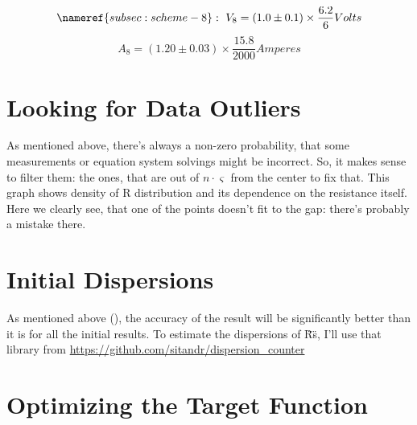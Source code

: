\documentclass[11pt]{memoir}
\newcommand{\initialCurrentDispersion}{0.03}
\newcommand{\initialVoltageDispersion}{0.1}
\newcommand{\voltageConvertingFrac}{\frac{6.2}{6}}
\newcommand{\currentConvertingFrac}{\frac{15.8}{2000}}
\begin{document}
    \begin{equation*}
        \nameref{subsec:scheme-8}: ~
        V_8 = \left( 1.0 \pm \initialVoltageDispersion \right) \times \voltageConvertingFrac Volts
    \end{equation*}
    \begin{equation*}
        A_8 = \left( 1.20 \pm \initialCurrentDispersion \right) \times \currentConvertingFrac Amperes
    \end{equation*}


    \newpage
    \section {Looking for Data Outliers}\label{sec:looking-for-data-outliers}

    As mentioned above, there's always a non-zero probability, that some measurements or equation system solvings might be incorrect. \newline
    So, it makes sense to filter them: the ones, that are out of $n \cdot \varsigma$ from the center to fix that.\newline
    This graph shows density of R distribution and its dependence on the resistance itself.
    Here we clearly see, that one of the points doesn't fit to the gap: there's probably a mistake there. \newline


    \newpage
    \section {Initial Dispersions}\label{sec:initial-dispersions}
    \newline
    As mentioned above (), the accuracy of the result will be significantly better than it is for all the initial results.\newline
    To estimate the dispersions of \"R\"s, I'll use that library from \newline
    \url{https://github.com/sitandr/dispersion_counter}\newline


    \newpage
    \section{Optimizing the Target Function}\label{sec:optimizing-the-target-function}

    
\end{document}
